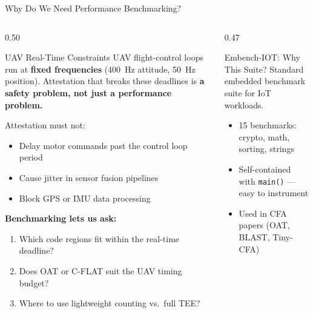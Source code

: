 \documentclass[aspectratio=169, 10pt]{beamer}
\begin{document}
\begin{frame}{Why Do We Need Performance Benchmarking?}
    \begin{columns}[T]
        \begin{column}{0.50\textwidth}
            \begin{defbox}{UAV Real-Time Constraints}
                \scriptsize UAV flight-control loops run at \textbf{fixed frequencies}
                (400~Hz attitude, 50~Hz position).
                Attestation that breaks these deadlines is
                \textbf{a safety problem, not just a performance problem.}
                \vspace{2pt}

                Attestation must not:
                \begin{itemize}\scriptsize
                    \item Delay motor commands past the control loop period
                    \item Cause jitter in sensor fusion pipelines
                    \item Block GPS or IMU data processing
                \end{itemize}
            \end{defbox}
            \vspace{3pt}
            \textbf{\scriptsize Benchmarking lets us ask:}
            \begin{enumerate}\scriptsize
                \item Which code regions fit within the real-time deadline?
                \item Does OAT or C-FLAT suit the UAV timing budget?
                \item Where to use lightweight counting vs.\ full TEE?
            \end{enumerate}
        \end{column}
        \begin{column}{0.47\textwidth}
            \begin{defbox}{Embench-IOT: Why This Suite?}
                \scriptsize Standard embedded benchmark suite for IoT workloads.
                \begin{itemize}\scriptsize
                    \item 15 benchmarks: crypto, math, sorting, strings
                    \item Self-contained with \texttt{main()} --- easy to instrument
                    \item Used in CFA papers (OAT, BLAST, Tiny-CFA)

\end{itemize}
\end{defbox}
\end{column}
\end{columns}
\end{frame}
\end{document}
